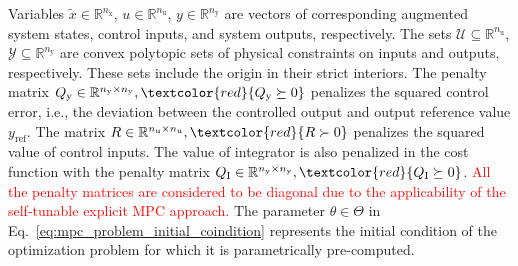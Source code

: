 \documentclass[preprint,12pt]{elsarticle}
\newcommand{\change}[1]{\textcolor{red}{#1}}
\begin{document}
	Variables $\widetilde{x} \in \mathbb{R}^{n_{\widetilde{\mathrm{x}}}}$, $u \in \mathbb{R}^{n_{\mathrm{u}}}$, $y \in \mathbb{R}^{n_{\mathrm{y}}}$ are vectors of corresponding augmented system states, control inputs, and system outputs, respectively. 
	The sets $\mathcal{U} \subseteq \mathbb{R}^{n_{\mathrm{u}}}$, $\mathcal{Y} \subseteq \mathbb{R}^{n_{\mathrm{y}}}$ are convex polytopic sets of physical constraints on inputs and outputs, respectively. These sets include the origin in their strict interiors. The penalty matrix $Q_\mathrm{y} \in \mathbb{R}^{n_{\mathrm{y}} \times n_{\mathrm{y}}}, \change{Q_\mathrm{y} \succeq 0}$ penalizes the squared control error, i.e., the deviation between the controlled output and output reference value $y_\mathrm{ref}$. The matrix $R \in \mathbb{R}^{n_{\mathrm{u}} \times n_{\mathrm{u}}}, \change{R \succ 0}$ penalizes the squared value of control inputs. 
	The value of integrator is also penalized in the cost function with the penalty matrix $Q_\mathrm{I} \in \mathbb{R}^{n_{\mathrm{y}} \times n_{\mathrm{y}}}, \change{Q_\mathrm{I} \succeq 0}$. \change{All the penalty matrices are considered to be diagonal due to the applicability of the self-tunable explicit MPC approach.}
	The parameter $\theta \in \Theta$ in Eq.~\eqref{eq:mpc_problem_initial_coindition} represents the initial condition of the optimization problem for which it is parametrically pre-computed. 
	
\end{document}
